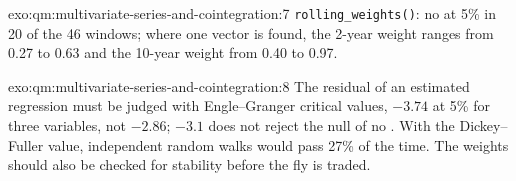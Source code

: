 \begin{solution}{exo:qm:multivariate-series-and-cointegration:7}
\texttt{rolling\_weights()}: no  at 5\% in 20 of the 46 windows; where one vector is found, the 2-year weight ranges from 0.27 to 0.63 and the 10-year weight
from 0.40 to 0.97.
\end{solution}

\begin{solution}{exo:qm:multivariate-series-and-cointegration:8}
The residual of an estimated regression must be judged with Engle--Granger critical values, $-3.74$ at 5\% for three variables, not $-2.86$; $-3.1$ does not reject
the null of no . With the Dickey--Fuller value, independent random walks would pass 27\% of the time. The weights should also be checked for stability before
the fly is traded.
\end{solution}

